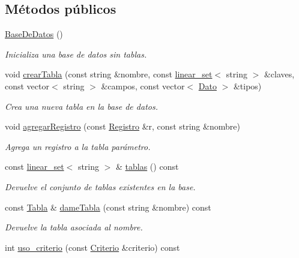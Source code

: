 \subsection*{Métodos públicos}
\begin{DoxyCompactItemize}
\item 
\hyperlink{classBaseDeDatos_a85a4992b2d9d7ed072efa792384495b5}{Base\+De\+Datos} ()
\begin{DoxyCompactList}\small\item\em Inicializa una base de datos sin tablas. \end{DoxyCompactList}\item 
void \hyperlink{classBaseDeDatos_aee0685f94a16b05b2893b24349716292}{crear\+Tabla} (const string \&nombre, const \hyperlink{classlinear__set}{linear\+\_\+set}$<$ string $>$ \&claves, const vector$<$ string $>$ \&campos, const vector$<$ \hyperlink{classDato}{Dato} $>$ \&tipos)
\begin{DoxyCompactList}\small\item\em Crea una nueva tabla en la base de datos. \end{DoxyCompactList}\item 
void \hyperlink{classBaseDeDatos_ada69808e7d6f26e34bab5b67ab4f5d05}{agregar\+Registro} (const \hyperlink{classRegistro}{Registro} \&r, const string \&nombre)
\begin{DoxyCompactList}\small\item\em Agrega un registro a la tabla parámetro. \end{DoxyCompactList}\item 
const \hyperlink{classlinear__set}{linear\+\_\+set}$<$ string $>$ \& \hyperlink{classBaseDeDatos_a24cb80244dbd9d34227f0d808aaeffa8}{tablas} () const 
\begin{DoxyCompactList}\small\item\em Devuelve el conjunto de tablas existentes en la base. \end{DoxyCompactList}\item 
const \hyperlink{classTabla}{Tabla} \& \hyperlink{classBaseDeDatos_ac83ffb074091a70f4879a85db830d603}{dame\+Tabla} (const string \&nombre) const 
\begin{DoxyCompactList}\small\item\em Devuelve la tabla asociada al nombre. \end{DoxyCompactList}\item 
int \hyperlink{classBaseDeDatos_a0b2094c4f3e59e38e5771b8d81da9077}{uso\+\_\+criterio} (const \hyperlink{classBaseDeDatos_a6742a222e87623bc92a810a693fb337b}{Criterio} \&criterio) const 

\end{DoxyCompactItemize}
